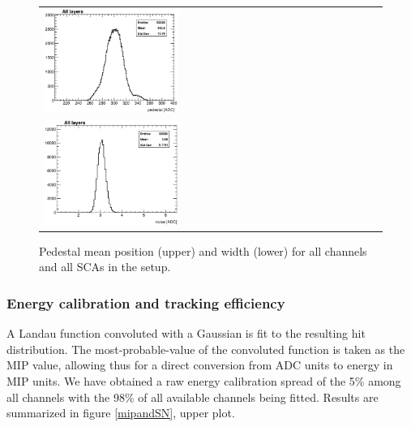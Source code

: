 \documentclass[final,3p,times,twocolumn]{elsarticle}
\begin{document}
\begin{figure}[!t]
  \centering
  \begin{tabular}{l}
    \includegraphics[width=0.4\textwidth]{../figs/pedestal/h_ped_mean.eps} \\
    \includegraphics[width=0.4\textwidth]{../figs/pedestal/h_ped_width.eps}
  \end{tabular}
  \caption{Pedestal mean position (upper) and width (lower) for all channels and all SCAs in the setup.}
\label{pedestal_all}
\end{figure}

\subsubsection{Energy calibration and tracking efficiency}
\label{sec:mip}

A Landau function convoluted with a Gaussian is fit to the resulting hit distribution. 
The most-probable-value of the convoluted function is taken as the MIP value, allowing thus for a direct
conversion from ADC units to energy in MIP units.
We have obtained a raw energy calibration spread of the 5\% among all channels with the 98\% of all 
available channels being fitted. Results are summarized in figure \ref{mipandSN}, upper plot.
\end{document}
